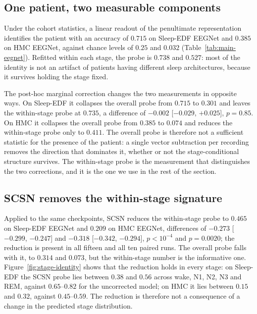 \subsection{One patient, two measurable components}
\label{sec:two-components}

Under the cohort statistics, a linear readout of the penultimate
representation identifies the patient with an accuracy of $0.715$ on
Sleep-EDF EEGNet and $0.385$ on HMC EEGNet, against chance levels of $0.25$
and $0.032$ (Table~\ref{tab:main-eegnet}). Refitted within each stage, the
probe is $0.738$ and $0.527$: most of the identity is not an artifact of
patients having different sleep architectures, because it survives holding
the stage fixed.

The post-hoc marginal correction changes the two measurements in opposite
ways. On Sleep-EDF it collapses the overall probe from $0.715$ to $0.301$ and
leaves the within-stage probe at $0.735$, a difference of $-0.002$
[$-0.029$, $+0.025$], $p=0.85$. On HMC it collapses the overall probe from
$0.385$ to $0.074$ and reduces the within-stage probe only to $0.411$. The
overall probe is therefore not a sufficient statistic for the presence of the
patient: a single vector subtraction per recording removes the direction that
dominates it, whether or not the stage-conditional structure survives. The
within-stage probe is the measurement that distinguishes the two corrections,
and it is the one we use in the rest of the section.

\subsection{SCSN removes the within-stage signature}
\label{sec:scsn-identity}

Applied to the same checkpoints, SCSN reduces the within-stage probe to
$0.465$ on Sleep-EDF EEGNet and $0.209$ on HMC EEGNet, differences of
$-0.273$ [$-0.299$, $-0.247$] and $-0.318$ [$-0.342$, $-0.294$], $p<10^{-4}$
and $p=0.0020$; the reduction is present in all fifteen and all ten paired
runs. The overall probe falls with it, to $0.314$ and $0.073$, but the
within-stage number is the informative one. Figure~\ref{fig:stage-identity}
shows that the reduction holds in every stage: on Sleep-EDF the SCSN probe
lies between $0.38$ and $0.56$ across wake, N1, N2, N3 and REM, against
$0.65$--$0.82$ for the uncorrected model; on HMC it lies between $0.15$ and
$0.32$, against $0.45$--$0.59$. The reduction is therefore not a consequence
of a change in the predicted stage distribution.

